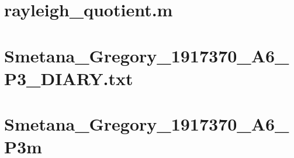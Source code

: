 \documentclass[11pt]{article} %
\begin{document}
\clearpage
\appendix
\section{rayleigh\_quotient.m}

\section{Smetana\_Gregory\_1917370\_A6\_P3\_DIARY.txt}


\section{Smetana\_Gregory\_1917370\_A6\_P3m}

\end{document}
